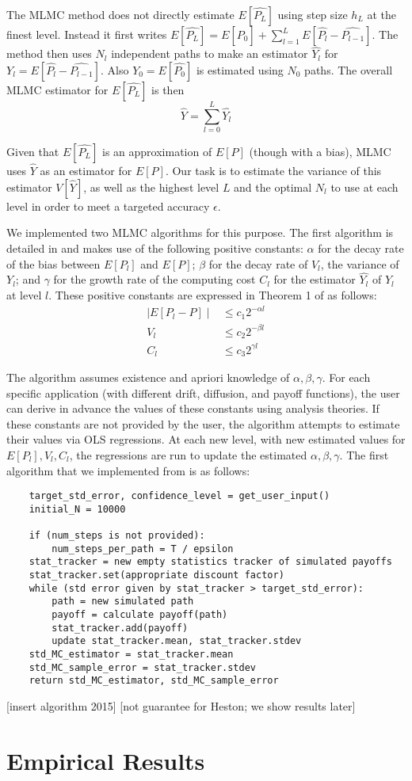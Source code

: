 \documentclass{article}
\begin{document}
	The MLMC method does not directly estimate $E[\widehat{P_L}]$ using step size $h_L$ at the finest level. Instead it first writes $E[\widehat{P_L}] = E[\widehat{P_0}] + \sum_{l=1}^L E[\widehat{P_l} - \widehat{P_{l-1}}]$. The method then uses $N_l$ independent paths to make an estimator $\widehat{Y_l}$ for $Y_l = E[\widehat{P_l} - \widehat{P_{l-1}}]$. Also $Y_0 = E[\widehat{P_0}]$ is estimated using $N_0$ paths. The overall MLMC estimator for $E[\widehat{P_L}]$ is then
	$$\widehat{Y} = \sum_{l=0}^L \widehat{Y_l}$$
	
	Given that $E[\widehat{P_L}]$ is an approximation of $E[P]$ (though with a bias), MLMC uses $\widehat{Y}$ as an estimator for $E[P]$. Our task is to estimate the variance of this estimator $V[\widehat{Y}]$, as well as the highest level $L$ and the optimal $N_l$ to use at each level in order to meet a targeted accuracy $\epsilon$.
	
	We implemented two MLMC algorithms for this purpose. The first algorithm is detailed in \cite{giles15} and makes use of the following positive constants: $\alpha$ for the decay rate of the bias between $E[P_l]$ and $E[P]$; $\beta$ for the decay rate of $V_l$, the variance of $Y_l$; and $\gamma$ for the growth rate of the computing cost $C_l$ for the estimator $\widehat{Y_l}$ of $Y_l$ at level $l$. These positive constants are expressed in Theorem 1 of \cite{giles15} as follows:
	\begin{align*}
	\mid E[P_l -P] \mid &\leq c_1 2^{-\alpha l} \\
	V_l &\leq c_2 2^{-\beta l} \\
	C_l &\leq c_3 2^{\gamma l}
	\end{align*}
	
	The algorithm assumes existence and apriori knowledge of $\alpha, \beta, \gamma$. For each specific application (with different drift, diffusion, and payoff functions), the user can derive in advance the values of these constants using analysis theories. If these constants are not provided by the user, the algorithm attempts to estimate their values via OLS regressions. At each new level, with new estimated values for $E[P_l], V_l, C_l$, the regressions are run to update the estimated $\alpha, \beta, \gamma$. The first algorithm that we implemented from \cite{giles15} is as follows:
	\begin{lstlisting}
	target_std_error, confidence_level = get_user_input()
	initial_N = 10000
	
    if (num_steps is not provided):
        num_steps_per_path = T / epsilon
    stat_tracker = new empty statistics tracker of simulated payoffs
    stat_tracker.set(appropriate discount factor)
    while (std error given by stat_tracker > target_std_error):
        path = new simulated path
        payoff = calculate payoff(path)
        stat_tracker.add(payoff)
        update stat_tracker.mean, stat_tracker.stdev
    std_MC_estimator = stat_tracker.mean
    std_MC_sample_error = stat_tracker.stdev
    return std_MC_estimator, std_MC_sample_error
    \end{lstlisting}
    
	[insert algorithm 2015]
	[not guarantee for Heston; we show results later]
		
	
	
\section{Empirical Results}



\end{document}
